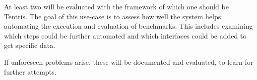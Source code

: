 At least two \tsp{} will be evaluated with the framework of which one should be Tentris\cite{bigerlTentrisTensorBasedTriple2020}.
The goal of this use-case is to assess how well the system helps automating the execution and evaluation of benchmarks.
This includes examining which steps could be further automated and which interfaces could be added to get specific data.

If unforeseen problems arise, these will be documented and evaluated, to learn for further attempts.





%
%
%
